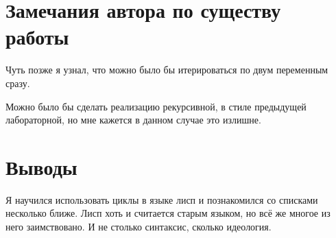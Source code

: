 \documentclass[12pt]{article}
\begin{document}
\section{Замечания автора по существу работы}

Чуть позже я узнал, что можно было бы итерироваться по двум переменным сразу.

Можно было бы сделать реализацию рекурсивной, в стиле предыдущей лабораторной,
но мне кажется в данном случае это излишне.

\section{Выводы}

\noindent Я научился использовать циклы в языке лисп и познакомился со списками несколько ближе.
Лисп хоть и считается старым языком, но всё же многое из него заимствовано. И не столько синтаксис,
сколько идеология.
\end{document}
